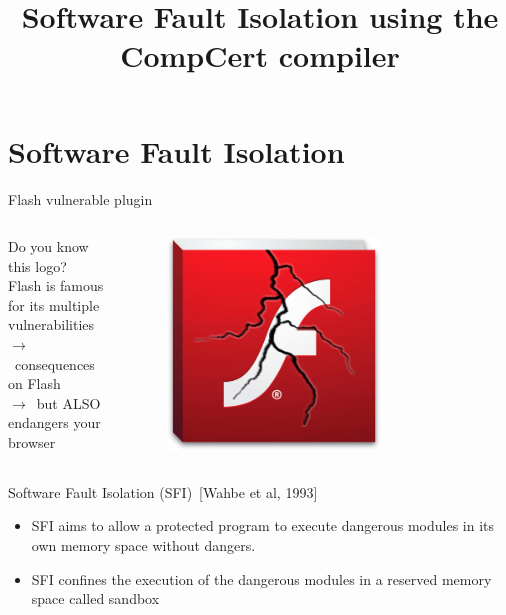 \documentclass{beamer}
\title{Software Fault Isolation using the CompCert compiler}
\author[\textit{Author}:~Alexandre Dang \and \textit{Supervisor}:~Frédéric Besson]
{%
	\texorpdfstring{
		\begin{columns}[t]
			\column{.45\linewidth}
				\begin{center}
				\textit{Author}: Alexandre Dang
				\end{center}
			\column{.45\linewidth}
				\begin{center}
				\textit{Supervisor}: Frédéric Besson
				\end{center}
		\end{columns}
	}
	{\textit{Auteur}: Alexandre Dang, \textit{Superviseur}: Frédéric Besson, \textit{\'Equipe}: Celtique}
}
\institute{Team Celtique}
\begin{document}
\frame{\titlepage}
 

\section{Software Fault Isolation}
\label{sec:Software Fault Isolation}



\begin{frame}{Flash vulnerable plugin}
	\begin{columns}[onlytextwidth]
		\begin{column}{0.5\textwidth}
			Do you know this logo?\\
			\vspace{5mm}
			Flash is famous for its multiple vulnerabilities\\
			$\rightarrow$~consequences on Flash\\
			$\rightarrow$~but ALSO endangers your browser
		\end{column}
		\begin{column}{0.5\textwidth}
			\begin{figure}
				\centering
				\includegraphics[width=0.7\textwidth]{images/flash.jpg}
			\end{figure}
		\end{column}
	\end{columns}
\end{frame}


\begin{frame}{Software Fault Isolation (SFI)~[Wahbe et al, 1993]}
	\begin{itemize}\itemsep20pt
		\item SFI aims to allow a protected program to execute dangerous modules in its own memory space without dangers. 
		\item SFI confines the execution of the dangerous modules in a reserved memory space called sandbox
	\end{itemize}
\end{frame}
\end{document}
